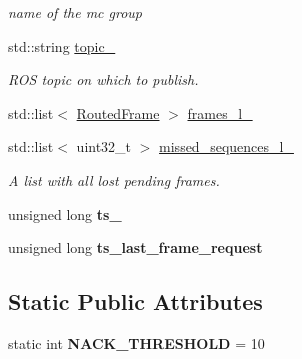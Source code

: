 \begin{DoxyCompactItemize}
\begin{DoxyCompactList}\small\item\em name of the mc group \end{DoxyCompactList}\item 
\hypertarget{classPacket_ae7e1f61be22aa9b212c7346145cc45c2}{std\-::string \hyperlink{classPacket_ae7e1f61be22aa9b212c7346145cc45c2}{topic\-\_\-}}\label{classPacket_ae7e1f61be22aa9b212c7346145cc45c2}

\begin{DoxyCompactList}\small\item\em R\-O\-S topic on which to publish. \end{DoxyCompactList}\item 
std\-::list$<$ \hyperlink{classRoutedFrame}{Routed\-Frame} $>$ \hyperlink{classPacket_af17876338c2f107655106432b5a6c2fd}{frames\-\_\-l\-\_\-}
\item 
\hypertarget{classPacket_ade11cd10d3b6b93268342de3af92944f}{std\-::list$<$ uint32\-\_\-t $>$ \hyperlink{classPacket_ade11cd10d3b6b93268342de3af92944f}{missed\-\_\-sequences\-\_\-l\-\_\-}}\label{classPacket_ade11cd10d3b6b93268342de3af92944f}

\begin{DoxyCompactList}\small\item\em A list with all lost pending frames. \end{DoxyCompactList}\item 
\hypertarget{classPacket_a338cd0d50a59c8714433f88ffc42e01b}{unsigned long {\bfseries ts\-\_\-}}\label{classPacket_a338cd0d50a59c8714433f88ffc42e01b}

\item 
\hypertarget{classPacket_ac6f05e12f7bba000bf2bdd9acab2349e}{unsigned long {\bfseries ts\-\_\-last\-\_\-frame\-\_\-request}}\label{classPacket_ac6f05e12f7bba000bf2bdd9acab2349e}

\end{DoxyCompactItemize}
\subsection*{Static Public Attributes}
\begin{DoxyCompactItemize}
\item 
\hypertarget{classPacket_a0bed9346a7b5b37e3f510e0b6c351605}{static int {\bfseries N\-A\-C\-K\-\_\-\-T\-H\-R\-E\-S\-H\-O\-L\-D} = 10}\label{classPacket_a0bed9346a7b5b37e3f510e0b6c351605}

\end{DoxyCompactItemize}


